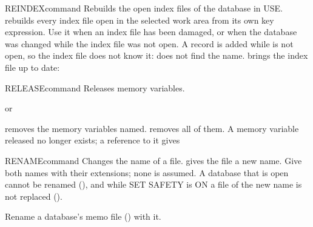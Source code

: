 \begin{XbaseEntry}{REINDEX}{command}
Rebuilds the open index files of the database in USE.
\Syntax
{}
\Usage
{} rebuilds every index file open in the selected work area from
its own key expression.  Use it when an index file has been damaged, or
when the database was changed while the index file was not open.
\Examples
A record is added while  is not open, so the index file
does not know it:  does not find the name.   brings
the index file up to date:
\end{XbaseEntry}

\begin{XbaseEntry}{RELEASE}{command}
Releases memory variables.
\Syntax
{}
\par or\par
{}
\Usage
{} removes the memory variables named.   removes all
of them.  A memory variable released no longer exists; a reference to it
gives 
\Examples
{}
\end{XbaseEntry}

\begin{XbaseEntry}{RENAME}{command}
Changes the name of a file.
\Syntax
{}
\Usage
{} gives the file a new name.  Give both names with their
extensions; none is assumed.  A database that is open cannot be renamed
(), and while SET SAFETY is ON a file of the
new name is not replaced ().

Rename a database's memo file () with it.
\Examples
{}
\end{XbaseEntry}

